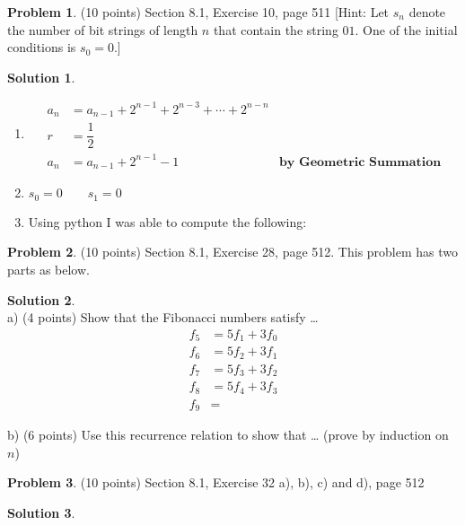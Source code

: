 \documentclass{article}
\theoremstyle{definition}
\newtheorem{problem}{Problem}
\newtheorem*{solution}{Solution}
\begin{document}
\begin{problem} (10 points)
Section 8.1, Exercise 10, page 511
[Hint: Let $s_n$ denote the number of bit strings of length $n$ that
contain the string $01$. One of the initial conditions is $s_0 = 0$.] 
\end{problem}
\begin{solution} \ \\
\begin{enumerate}[label=(\alph*)]
  \item 
  \begin{align*}
   a_n&=a_{n-1}+2^{n-1}+2^{n-3}+ \cdots +2^{n-n} \\
   r &= \dfrac{1}{2} \\
   a_n &= a_{n-1} + 2^{n-1} - 1 &\textbf{by Geometric Summation}
  \end{align*}
  \item 
  $s_0 = 0 \qquad s_1 = 0$
  
  \item Using python I was able to compute the following:
\end{enumerate}

  
\end{solution}

\begin{problem} (10 points)
Section 8.1, Exercise 28, page 512. This problem has two parts as below. 
\end{problem}
\begin{solution} 
\ \\
a) (4 points) Show that the Fibonacci numbers satisfy \ldots
\ \\
\begin{align*}
  f_5 &= 5 f_1 + 3 f_0 \\
  f_6 &= 5f_2 + 3f_1 \\
  f_7 &= 5f_3 + 3f_2 \\
  f_8 &= 5f_4 + 3f_3 \\
  f_9 &= 
\end{align*}

b) (6 points) Use this recurrence relation to show that \ldots 
(prove by induction on $n$)
\end{solution}

\begin{problem} (10 points)
Section 8.1, Exercise 32 a), b), c) and d), page 512
\end{problem}
\begin{solution} 
\end{solution}
\end{document}
